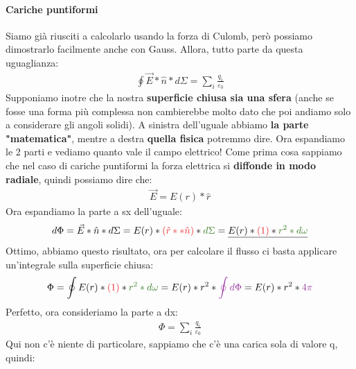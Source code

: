                 \paragraph{Cariche puntiformi}
                    Siamo già riusciti a calcolarlo usando la forza di Culomb, però possiamo dimostrarlo facilmente anche con Gauss. Allora, tutto parte da questa uguaglianza:
                    \begin{align*}
                        \oint\vec{E}*\hat{n}*d\Sigma = \sum_i\frac{q_i}{\varepsilon_0}
                    \end{align*}
                    Supponiamo inotre che la nostra \textbf{superficie chiusa sia una sfera} (anche se fosse una forma più complessa non cambierebbe molto dato che poi andiamo solo a considerare gli angoli solidi). 
                    A sinistra dell'uguale abbiamo \textbf{la parte "matematica"}, mentre a destra \textbf{quella fisica} potremmo dire. Ora espandiamo le 2 parti e vediamo quanto vale il campo elettrico! Come prima cosa sappiamo che nel caso di cariche puntiformi la forza elettrica si \textbf{diffonde in modo radiale}, quindi possiamo dire che:
                    \begin{align*}
                        \vec{E}=E(r)*\hat{r}
                    \end{align*}
                    Ora espandiamo la parte a sx dell'uguale:
                    \begin{align*}
                        d\Phi=\vec{E}*\hat{n}*d\Sigma = E(r)*\textcolor{Red}{(\hat{r}**\hat{n})}*\textcolor{OliveGreen}{d\Sigma} = \underline{E(r)*\textcolor{Red}{(1)}*\textcolor{OliveGreen}{r^2*d\omega}}
                    \end{align*}
                    Ottimo, abbiamo questo risultato, ora per calcolare il flusso ci basta applicare un'integrale sulla superficie chiusa:
                    \begin{align*}
                        \Phi = \oint E(r)*\textcolor{Red}{(1)}*\textcolor{OliveGreen}{r^2*d\omega} = E(r)*r^2*\textcolor{Purple}{\oint d\Phi} = E(r)*r^2*\textcolor{Purple}{4\pi}
                    \end{align*}
                    Perfetto, ora consideriamo la parte a dx:
                    \begin{align*}
                        \Phi = \sum_i\frac{q_i}{\varepsilon_0}
                    \end{align*}
                    Qui non c'è niente di particolare, sappiamo che c'è una carica sola di valore q, quindi:
